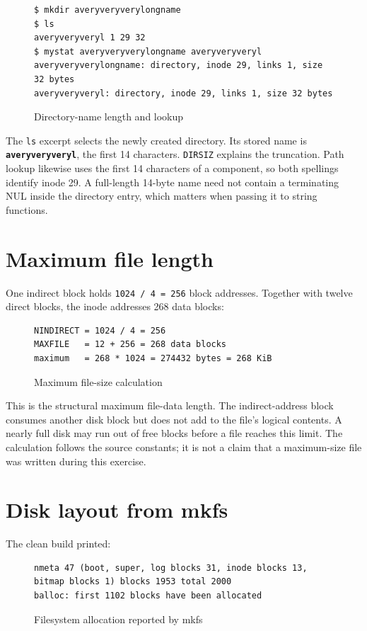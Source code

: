 \documentclass{../latex/utmreport}
\begin{document}
\begin{figure}[H]
\begin{lstlisting}
$ mkdir averyveryverylongname
$ ls
averyveryveryl 1 29 32
$ mystat averyveryverylongname averyveryveryl
averyveryverylongname: directory, inode 29, links 1, size 32 bytes
averyveryveryl: directory, inode 29, links 1, size 32 bytes
\end{lstlisting}
\caption{Directory-name length and lookup}
\end{figure}

The \texttt{ls} excerpt selects the newly created directory. Its stored
name is \textbf{\texttt{averyveryveryl}}, the first 14 characters.
\texttt{DIRSIZ} explains the truncation. Path lookup likewise uses the
first 14 characters of a component, so both spellings identify inode 29.
A full-length 14-byte name need not contain a terminating NUL inside the
directory entry, which matters when passing it to string functions.

\section{Maximum file length}\label{maximum-file-length}

One indirect block holds \texttt{1024\ /\ 4\ =\ 256} block addresses.
Together with twelve direct blocks, the inode addresses 268 data blocks:

\begin{figure}[H]
\begin{lstlisting}
NINDIRECT = 1024 / 4 = 256
MAXFILE   = 12 + 256 = 268 data blocks
maximum   = 268 * 1024 = 274432 bytes = 268 KiB
\end{lstlisting}
\caption{Maximum file-size calculation}
\end{figure}

This is the structural maximum file-data length. The indirect-address
block consumes another disk block but does not add to the file's logical
contents. A nearly full disk may run out of free blocks before a file
reaches this limit. The calculation follows the source constants; it is
not a claim that a maximum-size file was written during this exercise.

\section{Disk layout from mkfs}\label{disk-layout-from-mkfs}

The clean build printed:

\begin{figure}[H]
\begin{lstlisting}
nmeta 47 (boot, super, log blocks 31, inode blocks 13, bitmap blocks 1) blocks 1953 total 2000
balloc: first 1102 blocks have been allocated
\end{lstlisting}
\caption{Filesystem allocation reported by mkfs}
\end{figure}
\end{document}
